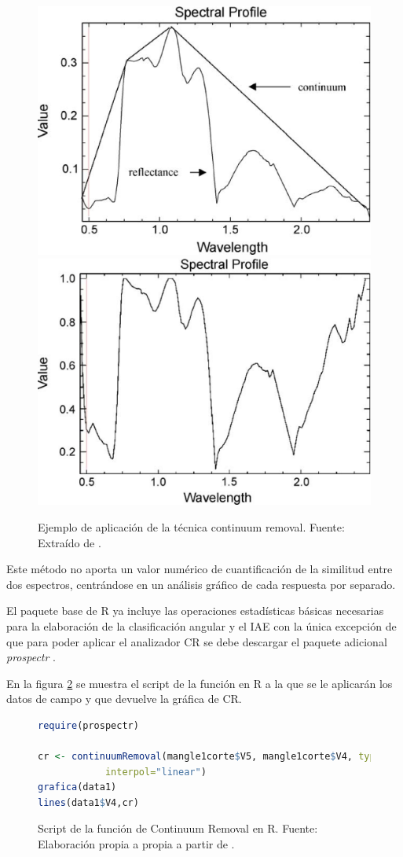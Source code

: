 \begin{figure}
	\centering
	\includegraphics[width=0.5\linewidth]{./Imagenes/CR1.eps}
	\includegraphics[width=0.5\linewidth]{./Imagenes/CR2.eps}
	\caption[Continuum Removal ejemplo]{Ejemplo de aplicación de la técnica continuum removal. Fuente: Extraído de \cite{huang2004estimating}.}
	\label{fig:ejemploCR}
\end{figure}

Este método no aporta un valor numérico de cuantificación de la similitud entre dos espectros, centrándose en un análisis gráfico de cada respuesta por separado.\Sep

El paquete base de R ya incluye las operaciones estadísticas básicas necesarias para la elaboración de la clasificación angular y el \ac{IAE} con la única excepción de que para poder aplicar el analizador \ac{CR} se debe descargar el paquete adicional \textit{prospectr} \citep{stevens2014introduction}.\Sep

En la figura \ref{fig:CR} se muestra el script de la función en R a la que se le aplicarán los datos de campo y que devuelve la gráfica de \ac{CR}.

\begin{figure}
\centering
\begin{lstlisting}[language = R, frame = single]
require(prospectr)

cr <- continuumRemoval(mangle1corte$V5, mangle1corte$V4, type="R",
			interpol="linear")
grafica(data1)
lines(data1$V4,cr)
\end{lstlisting}
\caption[Función de Continuum Removal]{Script de la función de Continuum Removal en R. Fuente: Elaboración propia a propia a partir de \cite{stevens2014introduction}.}
\label{fig:CR}
\end{figure}

